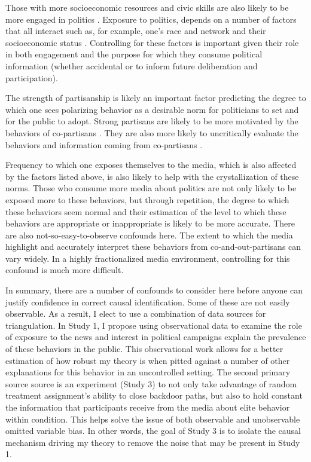 \documentclass [12pt]{article}
\begin{document}
Those with more socioeconomic resources and civic skills are also likely to be more engaged in politics \citep{verba_et-al_1995}. Exposure to politics, depends on a number of factors that all interact such as, for example, one's race and network \citep{carlson_et-al_2020} and their socioeconomic status \citep{schlozman_verba_brady_2013}. Controlling for these factors is important given their role in both engagement and the purpose for which they consume political information (whether accidental or to inform future deliberation and participation).

The strength of partisanship is likely an important factor predicting the degree to which one sees polarizing behavior as a desirable norm for politicians to set and for the public to adopt. Strong partisans are likely to be more motivated by the behaviors of co-partisans \citep{mason_2015}. They are also more likely to uncritically evaluate the behaviors and information coming from co-partisans \citep{taber_lodge_2006}.  

Frequency to which one exposes themselves to the media, which is also affected by the factors listed above, is also likely to help with the crystallization of these norms. Those who consume more media about politics are not only likely to be exposed more to these behaviors, but through repetition, the degree to which these behaviors seem normal and their estimation of the level to which these behaviors are appropriate or inappropriate is likely to be more accurate. There are also not-so-easy-to-observe confounds here. The extent to which the media highlight and accurately interpret these behaviors from co-and-out-partisans can vary widely. In a highly fractionalized media environment, controlling for this confound is much more difficult.

In summary, there are a number of confounds to consider here before anyone can justify confidence in correct causal identification. Some of these are not easily observable. As a result, I elect to use a combination of data sources for triangulation. In Study 1, I propose using observational data to examine the role of exposure to the news and interest in political campaigns explain the prevalence of these behaviors in the public. This observational work allows for a better estimation of how robust my theory is when pitted against a number of other explanations for this behavior in an uncontrolled setting. The second primary source source is an experiment (Study 3) to not only take advantage of random treatment assignment's ability to close backdoor paths, but also to hold constant the information that participants receive from the media about elite behavior within condition. This helps solve the issue of both observable and unobservable omitted variable bias. In other words, the goal of Study 3 is to isolate the causal mechanism driving my theory to remove the noise that may be present in Study 1. 
\end{document}
